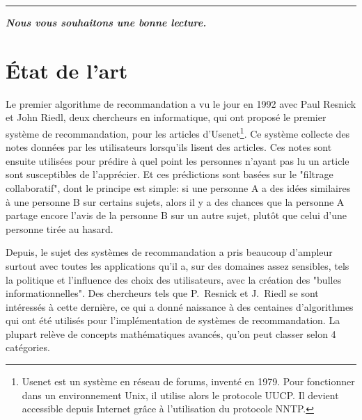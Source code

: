 \documentclass[light]{ceri}
\begin{document}


\rule{8cm}{0cm}
\parbox{\linewidth-8cm}{\textit{\textbf {Nous vous souhaitons une bonne lecture. }}}
\newpage
\section{État de l’art}

Le premier algorithme de recommandation a vu le jour en 1992 avec Paul Resnick et John Riedl, deux chercheurs en informatique, qui ont proposé le premier système de recommandation, pour les articles d’Usenet\footnote[1]{Usenet est un système en réseau de forums, inventé en 1979. Pour fonctionner dans un environnement Unix, il utilise alors le protocole UUCP. Il devient accessible depuis Internet grâce à l'utilisation du protocole NNTP.}. Ce système collecte des notes données par les utilisateurs lorsqu’ils lisent des articles. Ces notes sont ensuite utilisées pour prédire à quel point les personnes n’ayant pas lu un article sont susceptibles de l’apprécier. Et ces prédictions sont basées sur le "filtrage collaboratif", dont le principe est simple: si une personne A a des idées similaires à une personne B sur certains sujets, alors il y a des chances que la personne A partage encore l'avis de la personne B sur un autre sujet, plutôt que celui d'une personne tirée au hasard.

Depuis, le sujet des systèmes de recommandation a pris beaucoup d'ampleur surtout avec toutes les applications qu'il a, sur des domaines assez sensibles, tels la politique et l'influence des choix des utilisateurs, avec la création des "bulles informationnelles". Des chercheurs tels que  P.~Resnick et J.~Riedl se sont intéressés à cette dernière, ce qui a donné naissance à des centaines d'algorithmes qui ont été utilisés pour l’implémentation de systèmes de recommandation. La plupart relève de concepts mathématiques avancés, qu'on peut classer selon 4 catégories.
\end{document}
